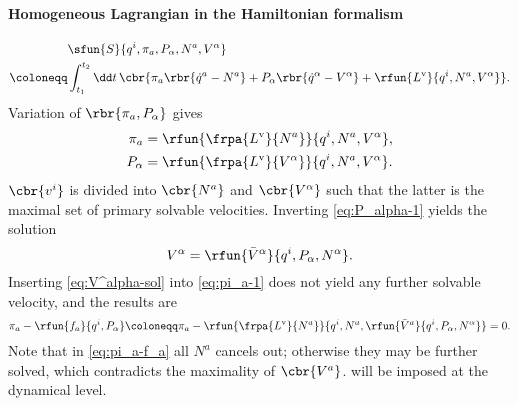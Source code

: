 \paragraph{Homogeneous Lagrangian in the Hamiltonian formalism}

\begin{align}
\phantom{}&\sfun{S}{q^i, \pi_a, P_\alpha, N^a, V^\alpha} \nonumber \\
\coloneqq& \int_{t_1}^{t_2} \dd t\,\cbr{ \pi_a \rbr{\dot q^a - N^a} + P_\alpha
\rbr{\dot q^\alpha - V^\alpha} + \rfun{L^\text{v}}{q^i, N^a, V^\alpha}}.
\end{align}
Variation of $\rbr{\pi_a, P_\alpha}$ gives
\begin{align}
\pi_a &= \rfun{\frpa{L^\text{v}}{N^a}}{q^i, N^a, V^\alpha},
\label{eq:pi_a-1}\\
P_\alpha &= \rfun{\frpa{L^\text{v}}{V^\alpha}}{q^i, N^a, V^\alpha}.
\label{eq:P_alpha-1}
\end{align}
$\cbr{v^i}$ is divided into $\cbr{N^a}$ and $\cbr{V^\alpha}$ such that the 
latter is the maximal set of primary solvable velocities. Inverting 
\cref{eq:P_alpha-1} yields the solution
\begin{equation}
V^\alpha = \rfun{\bar V^\alpha}{q^i, P_\alpha, N^\alpha}.
\label{eq:V^alpha-sol}
\end{equation}
Inserting \cref{eq:V^alpha-sol} into \cref{eq:pi_a-1} does not yield any 
further solvable velocity, and the results are
\begin{equation}
\pi_a - \rfun{f_a}{q^i, P_\alpha} \coloneqq \pi_a - 
\rfun{\frpa{L^\text{v}}{N^a}}{q^i, N^a,
\rfun{\bar V^a}{q^i, P_\alpha, N^\alpha}} = 0.
\label{eq:pi_a-f_a}
\end{equation}
Note that in \cref{eq:pi_a-f_a} all $N^a$ cancels out; otherwise they may be 
further solved, which contradicts the maximality of $\cbr{V^a}$. 
 will be imposed at the dynamical level.

